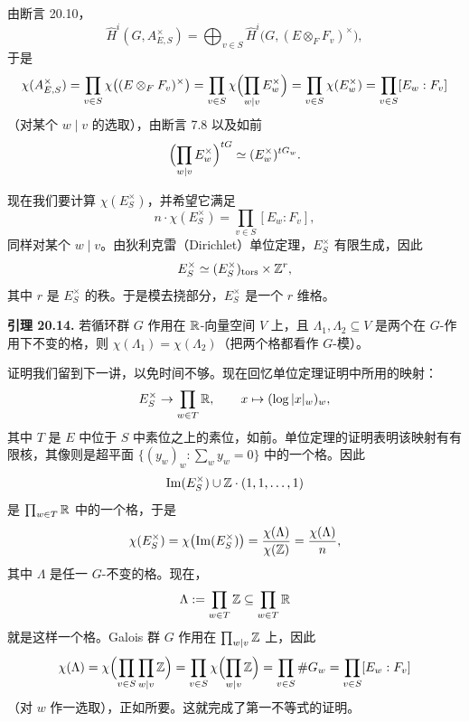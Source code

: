 由断言 20.10，
\[
\widehat H^i(G,A_{E,S}^\times)=\bigoplus_{v\in S}\widehat H^i\bigl(G,(E\otimes_F F_v)^\times\bigr),
\]
于是
\[
\chi(A_{E,S}^\times)=\prod_{v\in S}\chi\bigl((E\otimes_F F_v)^\times\bigr)
=\prod_{v\in S}\chi\Bigl(\prod_{w\mid v}E_w^\times\Bigr)
=\prod_{v\in S}\chi(E_w^\times)
=\prod_{v\in S}[E_w:F_v]
\]
（对某个 $w\mid v$ 的选取），由断言 7.8 以及如前
\[
\Bigl(\prod_{w\mid v}E_w^\times\Bigr)^{tG}\simeq(E_w^\times)^{tG_w}.
\]

现在我们要计算 $\chi(E_S^\times)$，并希望它满足
\[
n\cdot\chi(E_S^\times)=\prod_{v\in S}[E_w:F_v],
\]
同样对某个 $w\mid v$。由狄利克雷（Dirichlet）单位定理，$E_S^\times$ 有限生成，因此
\[
E_S^\times\simeq(E_S^\times)_{\mathrm{tors}}\times\mathbb{Z}^r,
\]
其中 $r$ 是 $E_S^\times$ 的秩。于是模去挠部分，$E_S^\times$ 是一个 $r$ 维格。

\textbf{引理 20.14.} 若循环群 $G$ 作用在 $\mathbb{R}$-向量空间 $V$ 上，且 $\Lambda_1,\Lambda_2\subseteq V$ 是两个在 $G$-作用下不变的格，则 $\chi(\Lambda_1)=\chi(\Lambda_2)$（把两个格都看作 $G$-模）。

证明我们留到下一讲，以免时间不够。现在回忆单位定理证明中所用的映射：
\[
E_S^\times\to\prod_{w\in T}\mathbb{R},\qquad x\mapsto(\log|x|_w)_w,
\]
其中 $T$ 是 $E$ 中位于 $S$ 中素位之上的素位，如前。单位定理的证明表明该映射有有限核，其像则是超平面 $\{(y_w)_w:\sum_w y_w=0\}$ 中的一个格。因此
\[
\operatorname{Im}(E_S^\times)\cup\mathbb{Z}\cdot(1,1,\dots,1)
\]
是 $\prod_{w\in T}\mathbb{R}$ 中的一个格，于是
\[
\chi(E_S^\times)=\chi\bigl(\operatorname{Im}(E_S^\times)\bigr)
=\frac{\chi(\Lambda)}{\chi(\mathbb{Z})}=\frac{\chi(\Lambda)}{n},
\]
其中 $\Lambda$ 是任一 $G$-不变的格。现在，
\[
\Lambda:=\prod_{w\in T}\mathbb{Z}\subseteq\prod_{w\in T}\mathbb{R}
\]
就是这样一个格。Galois 群 $G$ 作用在 $\prod_{w\mid v}\mathbb{Z}$ 上，因此
\[
\chi(\Lambda)=\chi\Bigl(\prod_{v\in S}\prod_{w\mid v}\mathbb{Z}\Bigr)
=\prod_{v\in S}\chi\Bigl(\prod_{w\mid v}\mathbb{Z}\Bigr)
=\prod_{v\in S}\#G_w=\prod_{v\in S}[E_w:F_v]
\]
（对 $w$ 作一选取），正如所要。这就完成了第一不等式的证明。
